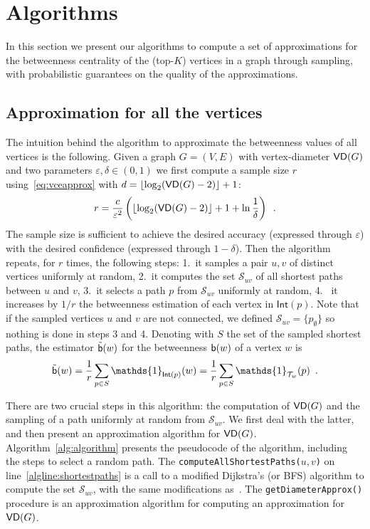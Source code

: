 \section{Algorithms}\label{sec:algo}
In this section we present our algorithms to compute a set of approximations for the
betweenness centrality of the (top-$K$) vertices in a graph through sampling,
with probabilistic guarantees on the quality of the approximations.

\subsection{Approximation for all the vertices}\label{sec:allvertapprox}
The intuition behind the algorithm to approximate the betweenness values of all
vertices is the following. Given a graph $G=(V,E)$
with vertex-diameter $\mathsf{VD}(G)$ and two parameters $\varepsilon,\delta\in(0,1)$
we first compute a sample size $r$ using~\eqref{eq:vceapprox} with
$d=\lfloor\log_2(\mathsf{VD}(G)-2)\rfloor+1$:
\begin{equation}\label{eq:samplesize}
r=\frac{c}{\varepsilon^2}\left(\lfloor\log_2(\VD(G)-2)\rfloor+1+\ln\frac{1}{\delta}\right)\enspace.
\end{equation}
The sample size is sufficient to achieve the desired accuracy
(expressed through $\varepsilon$) with the desired confidence (expressed through
$1-\delta$). Then the algorithm repeats, for $r$ times, the following steps:
1.~it samples a pair $u,v$ of distinct vertices uniformly at random, 2.~it
computes the set $\mathcal{S}_{uv}$ of all shortest paths between $u$ and $v$,
3.~it selects a path $p$ from $\mathcal{S}_{uv}$ uniformly at random, 4.~ it
increases by $1/r$ the betweenness estimation of each vertex in
$\mathsf{Int}(p)$. Note that if the sampled vertices $u$ and $v$ are not
connected, we defined $\mathcal{S}_{uv}=\{p_\emptyset\}$ so nothing is done in
steps 3 and 4. Denoting with $S$ the set of the sampled shortest paths, the
estimator $\tilde{\mathsf{b}}(w)$ for the betweenness $\mathsf{b}(w)$ of a vertex $w$
is 
\[
\tilde\betw(w) = \frac{1}{r}\sum_{p\in S}
\mathds{1}_{\mathsf{Int}(p)}(w) = \frac{1}{r}\sum_{p\in S}
\mathds{1}_{\mathcal{T}_w}(p)\enspace.
\]

There are two crucial steps in this algorithm: the computation of $\mathsf{VD}(G)$ and
the sampling of a path uniformly at random from $\mathcal{S}_{uv}$. We first
deal with the latter, and then present an approximation algorithm for $\mathsf{VD}(G)$.
Algorithm~\ref{alg:algorithm} presents the pseudocode of the algorithm,
including the steps to select a random path.  The
\texttt{computeAllShortestPaths(}$u,v$\texttt{)}  on
line~\ref{algline:shortestpaths} is a call to a modified Dijkstra's (or BFS)
algorithm to compute the set $\mathcal{S}_{uv}$, with the same modifications
as~\citet{Brandes01}. The \texttt{getDiameterApprox()} procedure is an
approximation algorithm for computing an approximation for $\mathsf{VD}(G)$. %

